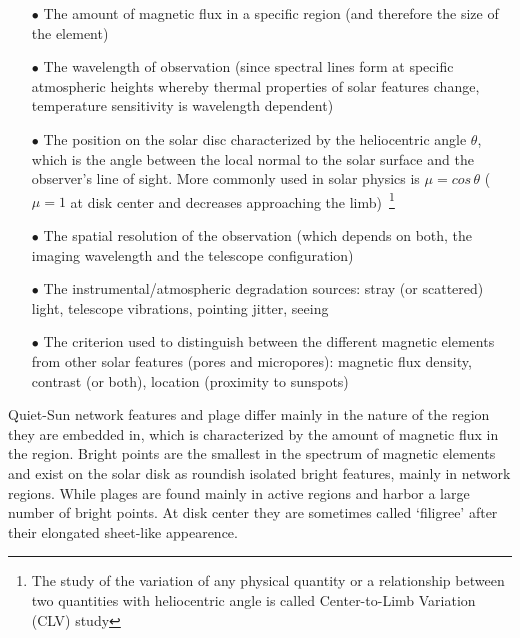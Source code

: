 \documentclass[goettingen, gauss, print]{thesis}
\begin{document}
\begin{enumerate}
\item[$\bullet$] The amount of magnetic flux in a specific region (and therefore the size of the element)
\item[$\bullet$] The wavelength of observation (since spectral lines form at specific atmospheric heights whereby thermal properties of solar features change, temperature sensitivity is wavelength dependent)
\item[$\bullet$] The position on the solar disc characterized by the heliocentric angle $\theta$, which is the angle between the local normal to the solar surface and the observer's line of sight. More commonly used in solar physics is $\mu = cos \,\theta$ ($\mu = 1$ at disk center and decreases approaching the limb)~\footnote{The study of the variation of any physical quantity or a relationship between two quantities with heliocentric angle is called Center-to-Limb Variation (CLV) study}
\item[$\bullet$] The spatial resolution of the observation (which depends on both, the imaging wavelength and the telescope configuration)
\item[$\bullet$] The instrumental/atmospheric degradation sources: stray (or scattered) light, telescope vibrations, pointing jitter, seeing
\item[$\bullet$] The criterion used to distinguish between the different magnetic elements from other solar features (pores and micropores): magnetic flux density, contrast (or both), location (proximity to sunspots)
\end{enumerate}


Quiet-Sun network features and plage differ mainly in the nature of the region they are embedded in, which is characterized by the amount of magnetic flux in the region.
Bright points are the smallest in the spectrum of magnetic elements and exist on the solar disk as roundish isolated bright features, mainly in network regions. While plages are found mainly in active regions and harbor a large number of bright points. At disk center they are sometimes called `filigree' \citep{dunn_solar_1973} after their elongated sheet-like appearence. 
\end{document}
